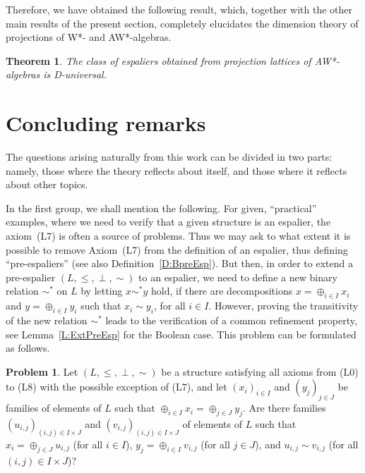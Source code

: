 \documentclass[psamsfonts,reqno]{memo-l}
\theoremstyle{plain}
\newtheorem{theorem}[lemma]{Theorem}
\theoremstyle{definition}
\newtheorem*{problem}{Problem}
\theoremstyle{remark}
\numberwithin{equation}{section}
\newcommand{\famm}[2]{(#1)_{#2}}
\begin{document}
Therefore, we have obtained the following result, which, together with the
other main results of the present section, completely elucidates the
dimension theory of projections of W*- and AW*-algebras.

\begin{theorem}\label{T:L(A)Duniv}
The class of espaliers obtained from projection
lattices of AW*-algebras is
D-universal.
\end{theorem}

\section{Concluding remarks}\label{S:Concluding}

The questions arising naturally from this work can be divided in two parts:
namely, those where the theory reflects about itself, and those where it
reflects about other topics.

In the first group, we shall mention the following. For given, ``practical''
examples, where we need to verify that a given structure is an espalier, the
axiom~(L7) is often a source of problems. Thus we may ask to what extent it
is possible to remove Axiom~(L7) from the definition of an espalier, thus
defining ``pre-espaliers'' (see also Definition~\ref{D:BpreEsp}). But then,
in order to extend a pre-espalier $(L,\leq,\perp,\sim)$ to an espalier, we
need to define a new binary relation $\sim^*$ on $L$ by letting $x\sim^*y$
hold, if there are decompositions $x=\oplus_{i\in I}x_i$ and
$y=\oplus_{i\in I}y_i$ such that $x_i\sim y_i$, for all $i\in I$. However,
proving the transitivity of the new relation $\sim^*$ leads to the
verification of a common refinement property, see Lemma~\ref{L:ExtPreEsp}
for the Boolean case. This problem can be formulated as follows.

\begin{problem}\label{Pb:pre-espRef}
Let $(L,\leq,\perp,\sim)$ be a structure satisfying all axioms from (L0) to
(L8) with the possible exception of (L7), and let $\famm{x_i}{i\in I}$ and
$\famm{y_j}{j\in J}$ be families of elements of $L$ such that
$\oplus_{i\in I}x_i=\oplus_{j\in J}y_j$. Are there families
$\famm{u_{i,j}}{(i,j)\in I\times J}$ and $\famm{v_{i,j}}{(i,j)\in I\times J}$
of elements of $L$ such that $x_i=\oplus_{j\in J}u_{i,j}$ (for all $i\in I$),
$y_j=\oplus_{i\in I}v_{i,j}$ (for all $j\in J$), and $u_{i,j}\sim v_{i,j}$
(for all $(i,j)\in I\times J$)?
\end{problem}
\end{document}
